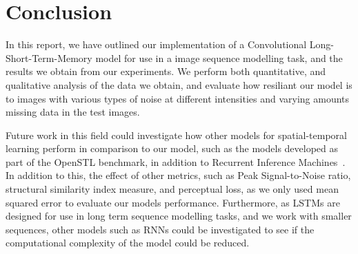 \documentclass[twocolumn]{article}
\begin{document}
\section{Conclusion}

In this report, we have outlined our implementation of a Convolutional Long-Short-Term-Memory model for use in a image sequence modelling task, and the results we obtain from our experiments. We perform both quantitative, and qualitative analysis of the data we obtain, and evaluate how resiliant our model is to images with various types of noise at different intensities and varying amounts missing data in the test images. 

Future work in this field could investigate how other models for spatial-temporal learning perform in comparison to our model, such as the models developed as part of the OpenSTL benchmark\cite{tan2023openstl,gao2022simvp,tan2022simvpv2,tan2023temporal}, in addition to Recurrent Inference Machines~\cite{putzky2017recurrentinferencemachinessolving}. In addition to this, the effect of other metrics, such as Peak Signal-to-Noise ratio, structural similarity index measure, and perceptual loss, as we only used mean squared error to evaluate our models performance. Furthermore, as LSTMs are designed for use in long term sequence modelling tasks, and we work with smaller sequences, other models such as RNNs could be investigated to see if the computational complexity of the model could be reduced.

\printbibliography
\end{document}
